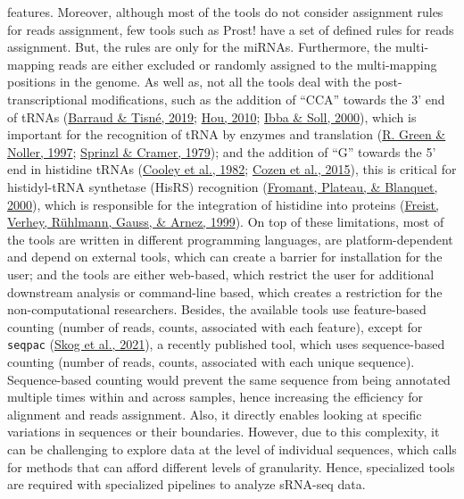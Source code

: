 \documentclass[12pt,twoside]{reedthesis}
\begin{document}
features. Moreover, although most of the tools do not consider
assignment rules for reads assignment, few tools such as Prost! have a
set of defined rules for reads assignment. But, the rules are only for
the miRNAs. Furthermore, the multi-mapping reads are either excluded or
randomly assigned to the multi-mapping positions in the genome. As well
as, not all the tools deal with the post-transcriptional modifications,
such as the addition of ``CCA'' towards the 3' end of tRNAs (\protect\hyperlink{ref-barraud2019}{Barraud \& Tisné, 2019}; \protect\hyperlink{ref-hou2010}{Hou, 2010}; \protect\hyperlink{ref-ibba2000}{Ibba \& Soll, 2000}), which is important for the recognition of tRNA
by enzymes and translation (\protect\hyperlink{ref-green1997}{R. Green \& Noller, 1997}; \protect\hyperlink{ref-sprinzl1979}{Sprinzl \& Cramer, 1979}); and the addition
of ``G'' towards the 5' end in histidine tRNAs (\protect\hyperlink{ref-cooley1982}{Cooley et al., 1982}; \protect\hyperlink{ref-cozen2015}{Cozen et al., 2015}),
this is critical for histidyl-tRNA synthetase (HisRS) recognition
(\protect\hyperlink{ref-fromant2000}{Fromant, Plateau, \& Blanquet, 2000}), which is responsible for the integration of histidine
into proteins (\protect\hyperlink{ref-freist1999}{Freist, Verhey, Rühlmann, Gauss, \& Arnez, 1999}). On top of these limitations, most of the
tools are written in different programming languages, are
platform-dependent and depend on external tools, which can create a
barrier for installation for the user; and the tools are either
web-based, which restrict the user for additional downstream analysis or
command-line based, which creates a restriction for the
non-computational researchers. Besides, the available tools use
feature-based counting (number of reads, counts, associated with each
feature), except for \texttt{seqpac} (\protect\hyperlink{ref-skog2021}{Skog et al., 2021}), a recently published tool,
which uses sequence-based counting (number of reads, counts, associated
with each unique sequence). Sequence-based counting would prevent the
same sequence from being annotated multiple times within and across
samples, hence increasing the efficiency for alignment and reads
assignment. Also, it directly enables looking at specific variations in
sequences or their boundaries. However, due to this complexity, it can
be challenging to explore data at the level of individual sequences,
which calls for methods that can afford different levels of granularity.
Hence, specialized tools are required with specialized pipelines to
analyze sRNA-seq data.
\end{document}
